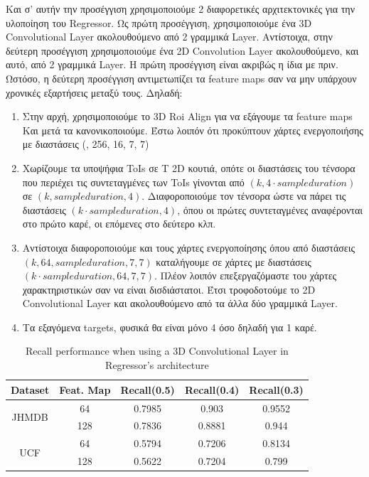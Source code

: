Και σ' αυτήν την προσέγγιση χρησιμοποιούμε 2 διαφορετικές αρχιτεκτονικές για την υλοποίηση του \en Regressor\gr.
Ως πρώτη προσέγγιση, χρησιμοποιούμε ένα \en 3D Convolutional Layer \gr ακολουθούμενο από 2 γραμμικά \en Layer\gr. Aντίστοιχα, στην δεύτερη προσέγγιση χρησιμοποιούμε ένα \en 2D
Convolution Layer \gr ακολουθούμενο, και αυτό, από 2 γραμμικά \en Layer\gr. H πρώτη προσέγγιση είναι ακριβώς η ίδια με πριν. Ωστόσο, η δεύτερη προσέγγιση
αντιμετωπίζει τα \en feature maps \gr σαν να μην υπάρχουν χρονικές εξαρτήσεις μεταξύ τους. Δηλαδή:
\begin{enumerate}
\item Στην αρχή, χρησιμοποιούμε το \en 3D Roi Align \gr για να εξάγουμε τα \en feature maps \gr Και μετά τα κανονικοποιούμε. Έστω λοιπόν ότι προκύπτουν  χάρτες ενεργοποιήσης
  με διαστάσεις (, 256, 16, 7, 7)
\item Χωρίζουμε τα υποψήφια \en ToIs \gr σε \en T 2D \gr κουτιά, οπότε οι διαστάσεις του τένσορα που περιέχει τις συντεταγμένες των \en ToIs \gr γίνονται από $(k,4\cdot sample duration)$
  σε $(k,sample duration, 4)$. Διαφοροποιούμε τον τένσορα ώστε να πάρει τις διαστάσεις  $(k\cdot sample duration, 4)$, όπου οι πρώτες  συντεταγμένες αναφέρονται
  στο πρώτο καρέ, οι επόμενες  στο δεύτερο κλπ.
\item Αντίστοιχα διαφοροποιούμε και τους χάρτες ενεργοποίησης όπου από διαστάσεις $(k, 64, sample duration, 7, 7)$ καταλήγουμε σε χάρτες με διαστάσεις $(k\cdot sample duration, 64, 7, 7)$.
  Πλέον λοιπόν επεξεργαζόμαστε του χάρτες χαρακτηριστικών σαν να είναι δισδιάστατοι. Έτσι τροφοδοτούμε το \en 2D Convolutional Layer \gr και ακολουθούμενο από τα άλλα δύο γραμμικά \en Layer\gr.
  \item Τα εξαγόμενα \en targets\gr, φυσικά θα είναι μόνο 4 όσο δηλαδή για 1 καρέ.
\end{enumerate}

\en
\begin{table}[h]
  \centering
  \begin{tabular}{||c | c || c  c  c||}
    \hline
    \textbf{Dataset} & \textbf{Feat. Map} & \textbf{Recall(0.5)} & \textbf{Recall(0.4)} & \textbf{Recall(0.3)}\\
    \hline
    \multirow{2}{*}{JHMDB} &  64 & 0.7985 & 0.903 & 0.9552 \\
    \cline{2-5}
    {} & 128 & 0.7836 & 0.8881 & 0.944\\
    \hline
    \multirow{2}{*}{UCF}  & 64 & 0.5794 & 0.7206 & 0.8134 \\
    \cline{2-5}
    {} & 128 & 0.5622 & 0.7204 & 0.799 \\
    \hline

  \end{tabular}
  \caption{Recall performance when using a 3D Convolutional Layer in Regressor's architecture}
  \label{table:gr_reg_2_1}
\end{table}
\gr
\en

